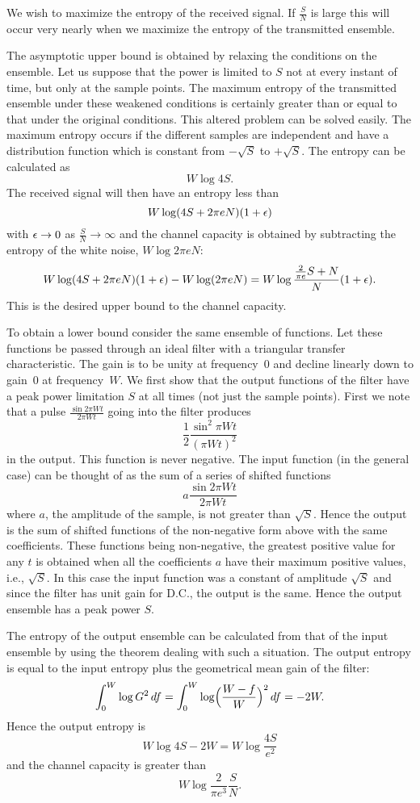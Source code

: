 We wish to maximize the entropy of the received signal.  If
$\displaystyle\frac S N$ is large this will occur very nearly when we
maximize the entropy of the transmitted ensemble.

The asymptotic upper bound is obtained by relaxing the conditions on the
ensemble.  Let us suppose that the power is limited to $S$ not at every
instant of time, but only at the sample points.  The maximum entropy of the
transmitted ensemble under these weakened conditions is certainly greater
than or equal to that under the original conditions.  This altered problem
can be solved easily.  The maximum entropy occurs if the different samples
are independent and have a distribution function which is constant from
$-\sqrt S$ to $+\sqrt S$.  The entropy can be calculated as
$$
W\log 4S.
$$
The  received signal will then have an entropy less than
$$
W\log(4S+2\pi e N)(1+\epsilon)
$$
with $\epsilon\to0$ as $\displaystyle\frac S N\to\infty$ and the channel
capacity is obtained by subtracting the entropy of the white noise, $W\log
2\pi e N$:
$$
W\log(4S+2\pi e N)(1+\epsilon)-W\log (2\pi e N)
=W\log\frac{\frac{2}{\pi e}S+N}{N}(1+\epsilon).
$$
This is the desired upper bound to the channel capacity.

To obtain a lower bound consider the same ensemble of functions.  Let these
functions be passed through an ideal filter with a triangular transfer
characteristic.  The gain is to be unity at frequency~0 and decline
linearly down to gain~0 at frequency~$W$.  We first show that the output
functions of the filter have a peak power limitation $S$ at all times (not
just the sample points).  First we note that a pulse
$\displaystyle\frac{\sin 2\pi Wt}{2\pi Wt}$ going into the filter produces
$$
\frac12\frac{\sin^2\pi Wt}{(\pi Wt)^2}
$$
in the output.  This function is never negative.  The input function (in
the general case) can be thought of as the sum of a series of shifted functions
$$
a\frac{\sin 2\pi Wt}{2\pi Wt}
$$
where $a$, the amplitude of the sample, is not greater than $\sqrt S$.
Hence the output is the sum of shifted functions of the non-negative form
above with the same coefficients.  These functions being non-negative, the
greatest positive value for any $t$ is obtained when all the coefficients $a$
have their maximum positive values, i.e., $\sqrt S$.  In this case the
input function was a constant of amplitude $\sqrt S$ and since the filter
has unit gain for D.C., the output is the same.  Hence the output ensemble
has a peak power $S$.

The entropy of the output ensemble can be calculated from that of the input
ensemble by using the theorem dealing with such a situation.  The output
entropy is equal to the input entropy plus the geometrical mean gain of the
filter:
$$
\int_0^W\log G^2\,df=\int_0^W\log\Bigl(\frac{W-f}{W}\Bigr)^2\,df=-2W.
$$
Hence the output entropy is
$$
W\log 4S-2W=W\log\frac{4S}{e^2}
$$
and the channel capacity is greater than
$$
W\log\frac{2}{\pi e^3}\frac S N.
$$


